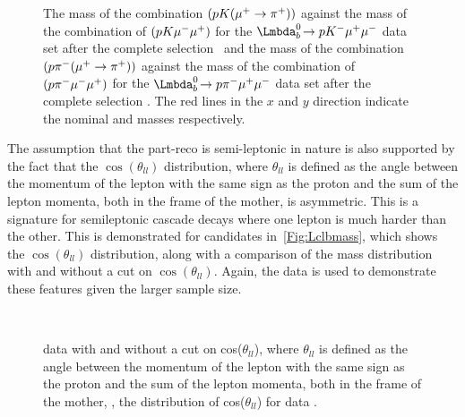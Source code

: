 \begin{figure}[!t]\def\nh{0.33\textwidth}
  \centering
  \textwidth
{}
 
\caption{The mass of the combination $(p{K}({\mu^+}\rightarrow{\ensuremath{{\pi}^+}}))$ against the mass of the combination of $(p{K}{\mu^-}{\mu^+})$ for the $\LbK$ data set after the complete selection~\protect{} and the mass of the combination $(p{{\pi}^-}({\mu^+}\rightarrow{\ensuremath{{\pi}^+}}))$ against the mass of the combination of $(p{{\pi}^-}{\mu^-}{\mu^+})$ for the $\Lbpi$ data set after the complete selection \protect{}. The red lines in the $x$ and $y$ direction indicate the nominal \Lc and \Lb masses respectively.}
\label{Fig:LcVsLb}
\end{figure}


The assumption that the part-reco is semi-leptonic in nature is also supported by the fact that the $\cos(\theta_{ll})$ distribution, where $\theta_{ll}$ is defined as the angle between the momentum of the lepton with the same sign as the proton and the sum of the lepton momenta, both in the frame of the \Lb mother, is asymmetric. This is a signature for semileptonic cascade decays where one lepton is much harder than the other.  This is demonstrated for \LbK candidates in~\autoref{Fig:Lclbmass}, which shows the $\cos(\theta_{ll})$ distribution, along with a comparison of the mass distribution with and without a cut on $\cos(\theta_{ll})$. Again, the \LbK data is used to demonstrate these features given the larger sample size. 


\begin{figure}[!t]\def\nh{0.33\textwidth}
  \centering
 
  \textwidth\\ %
  \textwidth  

  
  \caption{\LbK data with and without a cut on cos($\theta_{ll}$), where $\theta_{ll}$ is defined as the angle between the momentum of the lepton with the same sign as the proton and the sum of the lepton momenta, both in the frame of the \Lb mother, \protect{}, the distribution of cos($\theta_{ll}$) for \LbK data \protect{}.}
  \label{Fig:Lclbmass}
\end{figure}

